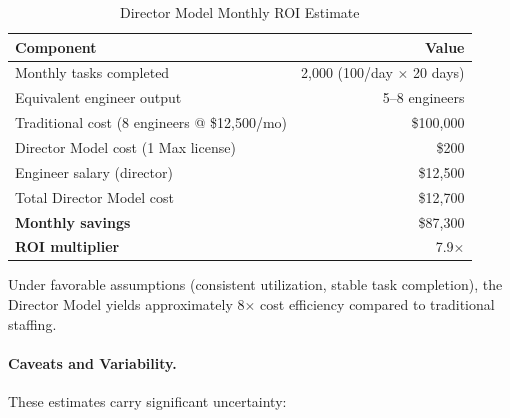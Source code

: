 \begin{table}[htbp]
\centering
\caption{Director Model Monthly ROI Estimate}
\label{tab:roi}
\begin{tabular}{lr}
\toprule
\textbf{Component} & \textbf{Value} \\
\midrule
Monthly tasks completed & 2,000 (100/day $\times$ 20 days) \\
Equivalent engineer output & 5--8 engineers \\
Traditional cost (8 engineers @ \$12,500/mo) & \$100,000 \\
Director Model cost (1 Max license) & \$200 \\
Engineer salary (director) & \$12,500 \\
Total Director Model cost & \$12,700 \\
\midrule
\textbf{Monthly savings} & \$87,300 \\
\textbf{ROI multiplier} & 7.9$\times$ \\
\bottomrule
\end{tabular}
\end{table}

Under favorable assumptions (consistent utilization, stable task completion),
the Director Model yields approximately 8$\times$ cost efficiency compared
to traditional staffing.

\paragraph{Caveats and Variability.}
These estimates carry significant uncertainty:

